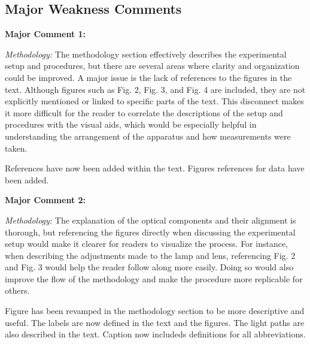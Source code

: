 \documentclass[%
 aip,
cp,  %
 amsmath,amssymb,
 reprint,%
]{revtex4-2}
\begin{document}
    \subsection{Major Weakness Comments}
        \begin{mdframed} \textbf{Major Comment 1:}

            \textit{Methodology:} The methodology section effectively describes the experimental setup and procedures, but there are several areas where clarity and organization could be improved. A major issue is the lack of references to the figures in the text. Although figures such as Fig. 2, Fig. 3, and Fig. 4 are included, they are not explicitly mentioned or linked to specific parts of the text. This disconnect makes it more difficult for the reader to correlate the descriptions of the setup and procedures with the visual aids, which would be especially helpful in understanding the arrangement of the apparatus and how measurements were
            taken.

        \end{mdframed}
        {\color{red}
        
        References have now been added within the text. Figures references for data have been added.

        }
        \begin{mdframed} \textbf{Major Comment 2:}

            \textit{Methodology:} The explanation of the optical components and their alignment is thorough, but referencing the figures
            directly when discussing the experimental setup would make it clearer for readers to visualize the process. For instance, when describing the adjustments made to the lamp and lens, referencing Fig. 2 and Fig. 3 would help the reader follow along more easily. Doing so would also improve the flow of the methodology and make the procedure more replicable for others.
        \end{mdframed}
        {\color{red}

            Figure has been revamped in the methodology section to be more descriptive and useful. The labels are now defined in the text and the figures. The light paths are also described in the text. Caption now includeds definitions for all abbreviations.

        }
\end{document}
